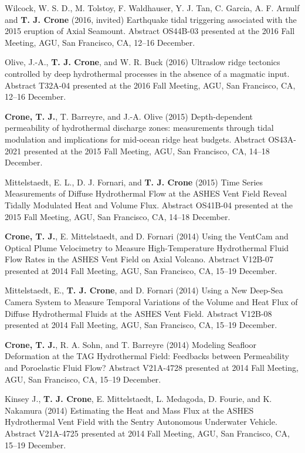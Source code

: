 \documentclass[11pt]{res}
\begin{document}
\begin{resume}
Wilcock, W. S. D., M. Tolstoy, F. Waldhauser, Y. J. Tan, C. Garcia, A. F. Arnulf and {\bf T. J. Crone} (2016, invited) Earthquake tidal triggering associated with the 2015 eruption of Axial Seamount. Abstract OS44B-03 presented at the 2016 Fall Meeting, AGU, San Francisco, CA, 12--16 December.

Olive, J.-A., {\bf T. J. Crone}, and W. R. Buck (2016) Ultraslow ridge tectonics controlled by deep hydrothermal processes in the absence of a magmatic input. Abstract T32A-04 presented at the 2016 Fall Meeting, AGU, San Francisco, CA, 12--16 December.

{\bf Crone, T. J.},  T. Barreyre, and J.-A. Olive (2015) Depth-dependent permeability of hydrothermal discharge zones: measurements through tidal modulation and implications for mid-ocean ridge heat budgets. Abstract OS43A-2021 presented at the 2015 Fall Meeting, AGU, San Francisco, CA, 14--18 December.

Mittelstaedt, E. L., D. J. Fornari, and {\bf T. J. Crone} (2015) Time Series Measurements of Diffuse Hydrothermal Flow at the ASHES Vent Field Reveal Tidally Modulated Heat and Volume Flux. Abstract OS41B-04 presented at the 2015 Fall Meeting, AGU, San Francisco, CA, 14--18 December.

{\bf Crone, T. J.}, E. Mittelstaedt, and D. Fornari (2014) Using the VentCam and Optical Plume Velocimetry to Measure High-Temperature Hydrothermal Fluid Flow Rates in the ASHES Vent Field on Axial Volcano. Abstract V12B-07 presented at 2014 Fall Meeting, AGU, San Francisco, CA, 15--19 December.

Mittelstaedt, E., {\bf T. J. Crone}, and D. Fornari (2014) Using a New Deep-Sea Camera System to Measure Temporal Variations of the Volume and Heat Flux of Diffuse Hydrothermal Fluids at the ASHES Vent Field. Abstract V12B-08 presented at 2014 Fall Meeting, AGU, San Francisco, CA, 15--19 December.

{\bf Crone, T. J.}, R. A. Sohn, and T. Barreyre (2014) Modeling Seafloor Deformation at the TAG Hydrothermal Field: Feedbacks between Permeability and Poroelastic Fluid Flow? Abstract V21A-4728 presented at 2014 Fall Meeting, AGU, San Francisco, CA, 15--19 December.

Kinsey J., {\bf T. J. Crone}, E. Mittelstaedt, L. Medagoda, D. Fourie, and K. Nakamura (2014) Estimating the Heat and Mass Flux at the ASHES Hydrothermal Vent Field with the Sentry Autonomous Underwater Vehicle. Abstract V21A-4725 presented at 2014 Fall Meeting, AGU, San Francisco, CA, 15--19 December.


\end{resume}
\end{document}
